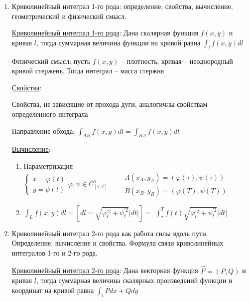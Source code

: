 \documentclass[12pt]{article}
\begin{document}
\begin{enumerate}
        \item Криволинейный интеграл 1-го рода: определение, свойства, вычисление, геометрический и физический смысл.

        \hyperlink{curvilinearintegraloffirstkind}{Криволинейный интеграл 1-го рода}: Дана скалярная функция $f(x, y)$ и кривая $l$, тогда суммарная величина функции на кривой равна $\int_l f(x, y) dl$

        Физический смысл: пусть $f(x, y)$ -- плотность, кривая -- неоднородный кривой стержень. Тогда интеграл -- масса стержня

        \hyperlink{curvilinearintegraloffirstkindproperties}{Свойства}:

        Свойства, не зависящие от прохода дуги, аналогичны свойствам определенного интеграла

        Направление обхода: $\int_{AB} f(x, y)dl = \int_{BA} f(x, y)dl$

        \hyperlink{curvilinearintegraloffirstkindcalculation}{Вычисление}:

        \begin{enumerate}
            \item Параметризация $\begin{cases}
                x = \varphi(t) \\
                y = \psi(t)
            \end{cases} \varphi, \psi \in C^1_{[\tau, T]} \quad\quad \begin{matrix}
                A(x_A, y_A) = (\varphi(\tau), \psi(\tau)) \\
                B(x_B, y_B) = (\varphi(T), \psi(T))
            \end{matrix}$

            \item $\int_{L} f(x, y) dl = \left[dl = \sqrt{\varphi_t^{\prime 2} + \psi_t^{\prime 2}}|dt|\right] = $
            $\int_\tau^T f(t) \sqrt{\varphi_t^{\prime 2} + \psi_t^{\prime 2}}|dt|$
        \end{enumerate}

        \item Криволинейный интеграл 2-го рода как работа силы вдоль пути. Определение, вычисление и свойства. Формула связи криволинейных интегралов 1-го и 2-го рода.

        \hyperlink{curvilinearintegralofsecondkind}{Криволинейный интеграл 2-го рода}:
        Дана векторная функция $\vec{F} = (P, Q)$ и кривая $l$, тогда суммарная величина скалярных произведений функции и координат на кривой равна $\int_{l} Pdx + Qdy$


\end{enumerate}
\end{document}
